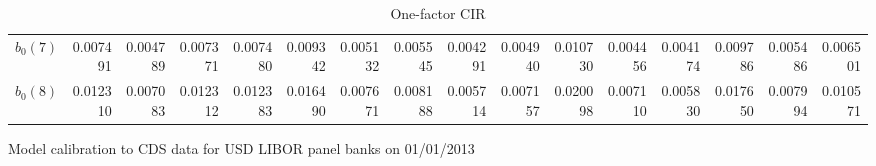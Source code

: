 \documentclass[12pt,a4paper]{article}
\theoremstyle{plain}
\numberwithin{equation}{section}
\begin{document}
\begin{table}[t]
\begin{subtable}{.5\textwidth}
{\begin{tabular}{|l|rrrrrrrrrrrrrr|r|}
    $\hat{b}_0(7)$  & 0.007491 & 0.004789 & 0.007371 & 0.007480 & 0.009342 & 0.005132 & 0.005545 & 0.004291 & 0.004940 & 0.010730 & 0.004456 & 0.004174 & 0.009786 & 0.005486 & 0.006501 \\
   $\hat{b}_0(8)$   & 0.012310 & 0.007083 & 0.012312 & 0.012383 & 0.016490 & 0.007671 & 0.008188 & 0.005714 & 0.007157 & 0.020098 & 0.007110 & 0.005830 & 0.017650 & 0.007994 & 0.010571 \\
    \bottomrule
    \end{tabular}%
    }
  \end{subtable}
   \caption{Model calibration to CDS data for USD LIBOR panel banks on 01/01/2013}\label{CDScoeff}\vspace*{1ex}

  \begin{subtable}{.5\textwidth}
  \centering
  \caption{One-factor CIR}
\end{subtable}
\end{table}
\end{document}
